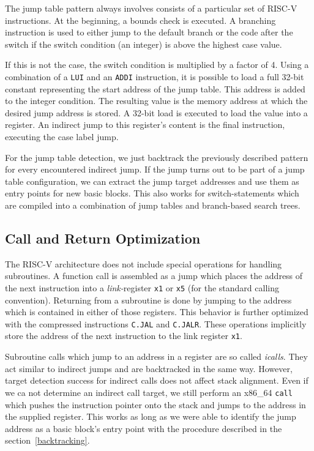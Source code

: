 \documentclass[course=eragp]{aspdoc}
\begin{document}
\par

The jump table pattern always involves consists of a particular set of RISC-V instructions.
At the beginning, a bounds check is executed. A branching instruction is used to either jump to the
default branch or the code after the switch if the switch condition (an integer) is above the
highest case value.

\par

If this is not the case, the switch condition is multiplied by a factor of 4.
Using a combination of a \texttt{LUI} and an \texttt{ADDI} instruction, it is possible to load a full
32-bit constant\cite{rvspec} representing the start address of the jump table.
This address is added to the integer condition. The resulting value is the memory address
at which the desired jump address is stored. A 32-bit load is executed to load the value into a
register. An indirect jump to this register's content is the final instruction, executing the case
label jump.

\par

For the jump table detection, we just backtrack the previously described pattern for every
encountered indirect jump. If the jump turns out to be part of a jump table configuration, we can
extract the jump target addresses and use them as entry points for new basic blocks. This also works
for switch-statements which are compiled into a combination of jump tables and branch-based search
trees.

\subsection{Call and Return Optimization}
The RISC-V architecture does not include special operations for handling subroutines. A function call
is assembled as a jump which places the address of the next instruction into a \emph{link-}register
\texttt{x1} or \texttt{x5} (for the standard calling convention).\cite{rvspec} Returning from a
subroutine is done by jumping to the address which is contained in either of those registers. This
behavior is further optimized with the compressed instructions \texttt{C.JAL} and
\texttt{C.JALR}. These operations implicitly store the address of the next instruction
to the link register \texttt{x1}.\cite{rvspec}

\par

Subroutine calls which jump to an address in a register are so called \emph{icalls}. They act
similar to indirect jumps and are backtracked in the same way. However, target detection success for indirect calls
does not affect stack alignment. Even if we ca not determine an indirect call target, we still perform
an x86\_64 \texttt{call} which pushes the instruction pointer onto the stack and jumps to the address
in the supplied register. This works as long as we were able to identify the jump address as a basic
block's entry point with the procedure described in the section\ \ref{backtracking}.
\end{document}
